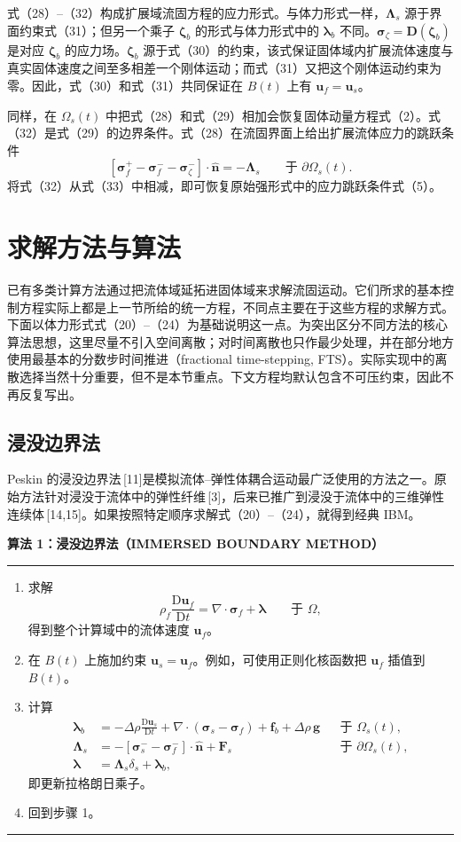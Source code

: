 \documentclass[UTF8,11pt,a4paper]{ctexart}
\newcommand{\D}{\mathrm{D}}
\newenvironment{algbox}[1]{%
  \par\medskip\noindent\textbf{#1}\par\smallskip\hrule\smallskip
  \begin{enumerate}[leftmargin=2.2em,label=\arabic*.]\small
}{%
  \end{enumerate}\smallskip\hrule\par\medskip
}
\begin{document}
式（28）--（32）构成扩展域流固方程的应力形式。与体力形式一样，$\bm\Lambda_s$ 源于界面约束式（31）；但另一个乘子 $\bm\zeta_b$ 的形式与体力形式中的 $\bm\lambda_b$ 不同。$\bm\sigma_{\zeta}=\bm D(\bm\zeta_b)$ 是对应 $\bm\zeta_b$ 的应力场。$\bm\zeta_b$ 源于式（30）的约束，该式保证固体域内扩展流体速度与真实固体速度之间至多相差一个刚体运动；而式（31）又把这个刚体运动约束为零。因此，式（30）和式（31）共同保证在 $B(t)$ 上有 $\bm u_f=\bm u_s$。

同样，在 $\Omega_s(t)$ 中把式（28）和式（29）相加会恢复固体动量方程式（2）。式（32）是式（29）的边界条件。式（28）在流固界面上给出扩展流体应力的跳跃条件
\begin{equation}
\left[\bm\sigma_f^{+}-\bm\sigma_f^{-}-\bm\sigma_{\zeta}^{-}\right]\cdot\hat{\bm n}
=-\bm\Lambda_s\qquad\text{于 }\partial\Omega_s(t). \tag{33}
\end{equation}
将式（32）从式（33）中相减，即可恢复原始强形式中的应力跳跃条件式（5）。

\section{求解方法与算法}

已有多类计算方法通过把流体域延拓进固体域来求解流固运动。它们所求的基本控制方程实际上都是上一节所给的统一方程，不同点主要在于这些方程的求解方式。下面以体力形式式（20）--（24）为基础说明这一点。为突出区分不同方法的核心算法思想，这里尽量不引入空间离散；对时间离散也只作最少处理，并在部分地方使用最基本的分数步时间推进（fractional time-stepping, FTS）。实际实现中的离散选择当然十分重要，但不是本节重点。下文方程均默认包含不可压约束，因此不再反复写出。

\subsection{浸没边界法}

Peskin 的浸没边界法\,[11]是模拟流体--弹性体耦合运动最广泛使用的方法之一。原始方法针对浸没于流体中的弹性纤维\,[3]，后来已推广到浸没于流体中的三维弹性连续体\,[14,15]。如果按照特定顺序求解式（20）--（24），就得到经典 IBM。

\begin{algbox}{算法 1：浸没边界法（IMMERSED BOUNDARY METHOD）}
\item 求解
\[
\rho_f\frac{\D\bm u_f}{\D t}=\nabla\cdot\bm\sigma_f+\bm\lambda\qquad\text{于 }\Omega,
\]
得到整个计算域中的流体速度 $\bm u_f$。
\item 在 $B(t)$ 上施加约束 $\bm u_s=\bm u_f$。例如，可使用正则化核函数把 $\bm u_f$ 插值到 $B(t)$。
\item 计算
\begin{align*}
\bm\lambda_b&=-\Delta\rho\frac{\D\bm u_s}{\D t}+\nabla\cdot(\bm\sigma_s-\bm\sigma_f)+\bm f_b+\Delta\rho\,\bm g &&\text{于 }\Omega_s(t),\\
\bm\Lambda_s&=-\left[\bm\sigma_s^{-}-\bm\sigma_f^{-}\right]\cdot\hat{\bm n}+\bm F_s &&\text{于 }\partial\Omega_s(t),\\
\bm\lambda&=\bm\Lambda_s\delta_s+\bm\lambda_b,
\end{align*}
即更新拉格朗日乘子。
\item 回到步骤 1。
\end{algbox}
\end{document}
